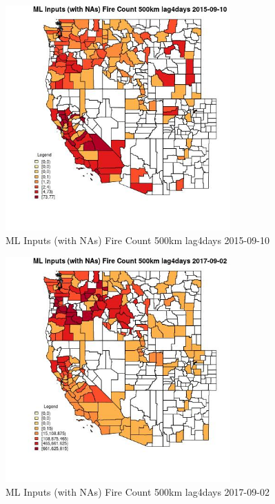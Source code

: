 \begin{figure} 
\centering  
\includegraphics[width=0.77\textwidth]{Code_Outputs/Report_ML_input_PM25_Step4_part_e_de_duplicated_aves_compiled_2019-05-20wNAs_CountyFire_Count_500km_lag4daysMean2015-09-10.jpg} 
\caption{\label{fig:Report_ML_input_PM25_Step4_part_e_de_duplicated_aves_compiled_2019-05-20wNAsCountyFire_Count_500km_lag4daysMean2015-09-10}ML Inputs (with NAs) Fire Count 500km lag4days 2015-09-10} 
\end{figure} 
 

\begin{figure} 
\centering  
\includegraphics[width=0.77\textwidth]{Code_Outputs/Report_ML_input_PM25_Step4_part_e_de_duplicated_aves_compiled_2019-05-20wNAs_CountyFire_Count_500km_lag4daysMean2017-09-02.jpg} 
\caption{\label{fig:Report_ML_input_PM25_Step4_part_e_de_duplicated_aves_compiled_2019-05-20wNAsCountyFire_Count_500km_lag4daysMean2017-09-02}ML Inputs (with NAs) Fire Count 500km lag4days 2017-09-02} 
\end{figure} 
 

